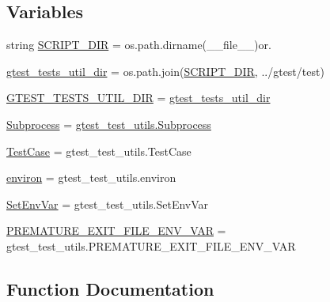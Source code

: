 \subsection*{Variables}
\begin{DoxyCompactItemize}
\item 
string \hyperlink{namespacegmock__test__utils_a4ef94affd9d889f78d67be80017eeddd}{S\+C\+R\+I\+P\+T\+\_\+\+D\+IR} = os.\+path.\+dirname(\+\_\+\+\_\+file\+\_\+\+\_\+)or\textquotesingle{}.\textquotesingle{}
\item 
\hyperlink{namespacegmock__test__utils_af6d94170502149e7f99cfa73ddc13c00}{gtest\+\_\+tests\+\_\+util\+\_\+dir} = os.\+path.\+join(\hyperlink{namespacegmock__test__utils_a4ef94affd9d889f78d67be80017eeddd}{S\+C\+R\+I\+P\+T\+\_\+\+D\+IR}, \textquotesingle{}../gtest/test\textquotesingle{})
\item 
\hyperlink{namespacegmock__test__utils_ae7ee9324ba489b3cbd99c5e26006eba9}{G\+T\+E\+S\+T\+\_\+\+T\+E\+S\+T\+S\+\_\+\+U\+T\+I\+L\+\_\+\+D\+IR} = \hyperlink{namespacegmock__test__utils_af6d94170502149e7f99cfa73ddc13c00}{gtest\+\_\+tests\+\_\+util\+\_\+dir}
\item 
\hyperlink{namespacegmock__test__utils_a31a0e33565ec805d314cb0a4eb8317e6}{Subprocess} = \hyperlink{classgtest__test__utils_1_1_subprocess}{gtest\+\_\+test\+\_\+utils.\+Subprocess}
\item 
\hyperlink{namespacegmock__test__utils_a959c5af591e4d49b6d35745205b64509}{Test\+Case} = gtest\+\_\+test\+\_\+utils.\+Test\+Case
\item 
\hyperlink{namespacegmock__test__utils_a6f0938b5e8839ebc847b52a38f4d35e3}{environ} = gtest\+\_\+test\+\_\+utils.\+environ
\item 
\hyperlink{namespacegmock__test__utils_ab0c69f8ce649fdd5a17f99deedf3eb29}{Set\+Env\+Var} = gtest\+\_\+test\+\_\+utils.\+Set\+Env\+Var
\item 
\hyperlink{namespacegmock__test__utils_a9392c288e6da3024d65ec0bddc0d86c3}{P\+R\+E\+M\+A\+T\+U\+R\+E\+\_\+\+E\+X\+I\+T\+\_\+\+F\+I\+L\+E\+\_\+\+E\+N\+V\+\_\+\+V\+AR} = gtest\+\_\+test\+\_\+utils.\+P\+R\+E\+M\+A\+T\+U\+R\+E\+\_\+\+E\+X\+I\+T\+\_\+\+F\+I\+L\+E\+\_\+\+E\+N\+V\+\_\+\+V\+AR
\end{DoxyCompactItemize}


\subsection{Function Documentation}
